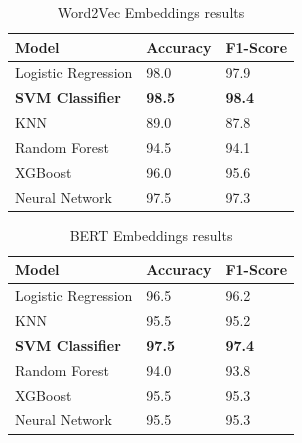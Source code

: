 \begin{table}[hbt!]
\begin{threeparttable}
\caption{Word2Vec Embeddings results}
\label{word2vec_embeddings_results}
\begin{tabular}{lll}
\toprule
\headrow Model & Accuracy & F1-Score\\
\midrule
 Logistic Regression             &       98.0   &       97.9 \\
 \textbf{SVM Classifier}            &       \textbf{98.5} &       \textbf{98.4} \\
 KNN            &       89.0   &       87.8 \\
 Random Forest &       94.5 &       94.1 \\
 XGBoost        &       96.0   &       95.6 \\
 Neural Network  &       97.5 &       97.3 \\
\bottomrule
\end{tabular}
\end{threeparttable}
\end{table}

\begin{table}[hbt!]
\begin{threeparttable}
\caption{BERT Embeddings results}
\label{bert_embeddings_results}
\begin{tabular}{lll}
\toprule
\headrow Model & Accuracy & F1-Score\\
\midrule
 Logistic Regression                 &       96.5 &       96.2 \\
 KNN                &       95.5 &       95.2 \\
 \textbf{SVM Classifier}                &       \textbf{97.5} &       \textbf{97.4} \\
 Random Forest       &       94.0   &       93.8 \\
 XGBoost            &       95.5 &       95.3 \\
 Neural Network      &       95.5 &       95.3 \\
\bottomrule
\end{tabular}
\end{threeparttable}
\end{table}

